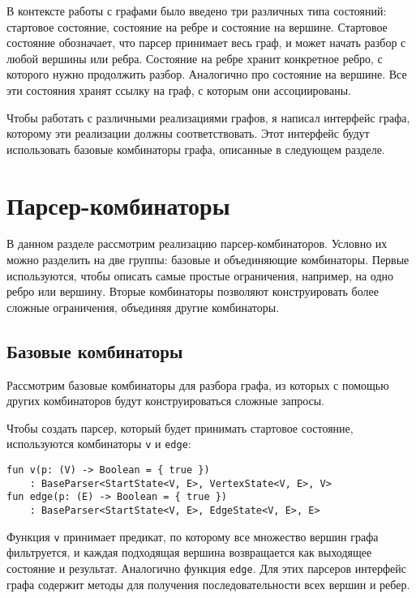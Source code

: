 В контексте работы с графами было введено три различных типа состояний: стартовое состояние, состояние на ребре и состояние на вершине. Стартовое состояние обозначает, что парсер принимает весь граф, и может начать разбор с любой вершины или ребра. Состояние на ребре хранит конкретное ребро, с которого нужно продолжить разбор. Аналогично про состояние на вершине. Все эти состояния хранят ссылку на граф, с которым они ассоциированы.

Чтобы работать с различными реализациями графов, я написал интерфейс графа, которому эти реализации должны соответствовать. Этот интерфейс будут использовать базовые комбинаторы графа, описанные в следующем разделе.

\section{Парсер-комбинаторы}

В данном разделе рассмотрим реализацию парсер-комбинаторов. Условно их можно разделить на две группы: базовые и объединяющие комбинаторы. Первые используются, чтобы описать самые простые ограничения, например, на одно ребро или вершину. Вторые комбинаторы позволяют конструировать более сложные ограничения, объединяя другие комбинаторы.

\subsection{Базовые комбинаторы}

Рассмотрим базовые комбинаторы для разбора графа, из которых с помощью других комбинаторов будут конструироваться сложные запросы.

Чтобы создать парсер, который будет принимать стартовое состояние, используются комбинаторы \verb|v| и \verb|edge|:

\begin{nobreaks}
    \begin{lstlisting}
fun v(p: (V) -> Boolean = { true })
    : BaseParser<StartState<V, E>, VertexState<V, E>, V>
fun edge(p: (E) -> Boolean = { true })
    : BaseParser<StartState<V, E>, EdgeState<V, E>, E> 
\end{lstlisting}
\end{nobreaks}

Функция \verb|v| принимает предикат, по которому все множество вершин графа фильтруется, и каждая подходящая вершина возвращается как выходящее состояние и результат.
Аналогично функция \verb|edge|.
Для этих парсеров интерфейс графа содержит методы для получения последовательности всех вершин и ребер.

